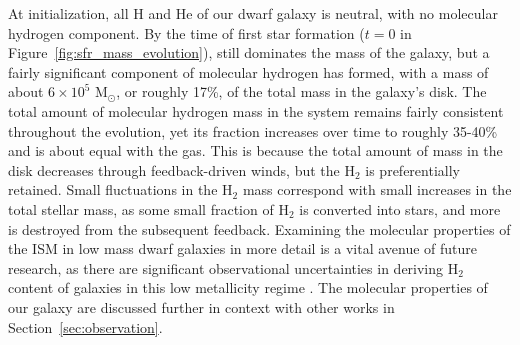 \documentclass[twocolumn]{aastex61}
\begin{document}
At initialization, all H and He of our dwarf galaxy is neutral, with no molecular hydrogen component. By the time of first star formation ($t=0$ in Figure~\ref{fig:sfr_mass_evolution}),  still dominates the mass of the galaxy, but a fairly significant component of molecular hydrogen has formed, with a mass of about $6 \times 10^5$ M$_{\odot}$, or roughly 17\%, of the total mass in the galaxy's disk. The total amount of molecular hydrogen mass in the system remains fairly consistent throughout the evolution, yet its fraction increases over time to roughly 35-40\% and is about equal with the  gas. This is because the total amount of mass in the disk decreases through feedback-driven winds, but the H$_2$ is preferentially retained. Small fluctuations in the H$_2$ mass correspond with small increases in the total stellar mass, as some small fraction of H$_2$ is converted into stars, and more is destroyed from the subsequent feedback. Examining the molecular properties of the ISM in low mass dwarf galaxies in more detail is a vital avenue of future research, as there are significant observational uncertainties in deriving H$_2$ content of galaxies in this low metallicity regime \citep{Leroy2008,McQuinn2012,Amorin2016}. The molecular properties of our galaxy are discussed further in context with other works in Section~\ref{sec:observation}. 
\end{document}
